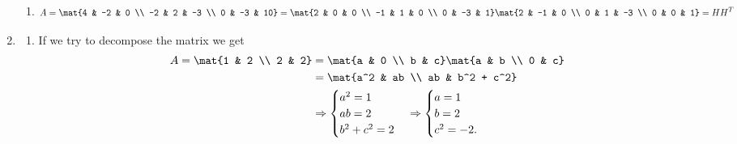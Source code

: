 \documentclass{article}
\begin{document}
\begin{enumerate}
{\begin{enumerate}
{\begin{displaymath}
                    \end{displaymath}
                }
                \item {
                    \begin{displaymath}
                        A = \mat{4 & -2 & 0 \\ -2 & 2 & -3 \\ 0 & -3 & 10} = \mat{2 & 0 & 0 \\ -1 & 1 & 0 \\ 0 & -3 & 1}\mat{2 & -1 & 0 \\ 0 & 1 & -3 \\ 0 & 0 & 1} = HH^T
                    \end{displaymath}
                }
            \end{enumerate}
        }
        \item {
            \begin{enumerate}
                \item {
                    If we try to decompose the matrix we get
                    \begin{displaymath}
                        \begin{aligned}
                            A = \mat{1 & 2 \\ 2 & 2} &=
                            \mat{a & 0 \\ b & c}\mat{a & b \\ 0 & c} \\
                            &=
                            \mat{a^2 & ab \\ ab & b^2 + c^2}\\
                            &\Rightarrow
                            \begin{cases}
                                a^2 = 1 \\
                                ab = 2 \\
                                b^2 + c^2 = 2
                            \end{cases}
                            \Rightarrow
                            \begin{cases}
                                a = 1 \\
                                b = 2 \\
                                c^2 = -2.
                            \end{cases}
                        \end{aligned}
                    \end{displaymath}
}
\end{enumerate}}
\end{enumerate}
\end{document}
